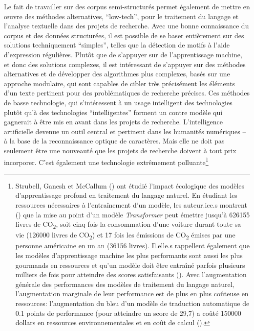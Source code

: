 Le fait de travailler sur des corpus semi-structurés permet également de mettre en œuvre des méthodes alternatives, \enquote{low-tech}, pour le traitement du langage et l'analyse textuelle dans des projets de recherche. Avec une bonne connaissance du corpus et des données structurées, il est possible de se baser entièrement sur des solutions techniquement \enquote{simples}, telles que la détection de motifs à l'aide d'\glspl{expression régulière}. Plutôt que de s'appuyer sur de l'apprentissage machine, et donc des solutions complexes, il est intéressant de s'appuyer sur des méthodes alternatives et de développer des algorithmes plus complexes, basés sur une approche modulaire, qui sont capables de cibler très précisément les éléments d'un texte pertinent pour des problématiques de recherche précises. Ces méthodes de basse technologie, qui s'intéressent à un usage intelligent des technologies plutôt qu'à des technologies \enquote{intelligentes} forment un contre modèle qui gagnerait à être mis en avant dans les projets de recherche. L'intelligence artificielle devenue un outil central et pertinent dans les humanités numériques -- à la base de la reconnaissance optique de caractères. Mais elle ne doit pas seulement être une nouveauté que les projets de recherche doivent à tout prix incorporer. C'est également une technologie extrêmement polluante\footnote{
	Strubell, Ganesh et McCallum (\cite{strubell_energy_2019}) ont étudié l'impact écologique des modèles d'apprentissage profond en traitement du langage naturel. En étudiant les ressources nécessaires à l'entraînement d'un modèle, les auteur.ice.s montrent (\cite[p. 1]{strubell_energy_2019}) que la mise au point d'un modèle \textit{Transformer} peut émettre jusqu'à 626155 livres de CO\textsubscript{2}, soit cinq fois la consommation d'une voiture durant toute sa vie (126000 livres de CO\textsubscript{2}) et 17 fois les émissions de CO\textsubscript{2} émises par une personne américaine en un an (36156 livres). Il.elle.s rappellent également que les modèles d'apprentissage machine les plus performants sont aussi les plus gourmands en ressources et qu'un modèle doit être entraîné parfois plusieurs milliers de fois pour atteindre des scores satisfaisants (\cite[p. 1]{strubell_energy_2019}). Avec l'augmentation générale des performances des modèles de traitement du langage naturel, l'augmentation marginale de leur performance est de plus en plus coûteuse en ressources: l'augmentation du \gls{bleu} d'un modèle de traduction automatique de 0.1 points de performance (pour atteindre un score de 29,7) a coûté 150000 dollars en ressources environnementales et en coût de calcul (\cite[p. 4]{strubell_energy_2019}).
}
